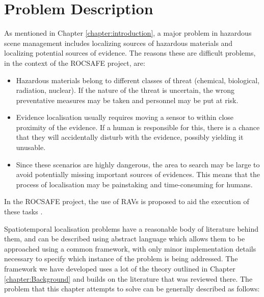\section{Problem Description}\label{sec:TLocalisationProbDescription}
As mentioned in Chapter \ref{chapter:introduction}, a major problem in hazardous scene management includes localizing sources of hazardous materials and localizing potential sources of evidence. The reasons these are difficult problems, in the context of the ROCSAFE project, are:
\begin{itemize}
    \item Hazardous materials belong to different classes of threat (chemical, biological, radiation, nuclear). If the nature of the threat is uncertain, the wrong preventative measures may be taken and personnel may be put at risk. 
    \item Evidence localisation usually requires moving a sensor to within close proximity of the evidence. If a human is responsible for this, there is a chance that they will accidentally disturb with the evidence, possibly yielding it unusable.
    \item Since these scenarios are highly dangerous, the area to search may be large to avoid potentially missing important sources of evidences. This means that the process of localisation may be painstaking and time-consuming for humans.
\end{itemize}
In the ROCSAFE project, the use of RAVs is proposed to aid the execution of these tasks \cite{Bagherzadeh2017ROCSAFE:Incidents}.%

  



Spatiotemporal localisation problems have a reasonable body of literature behind them, and can be described using abstract language which allows them to be approached using a common framework, with only minor implementation details necessary to specify which instance of the problem is being addressed. The framework we have developed uses a lot of the theory outlined in Chapter \ref{chapter:Background} and builds on the literature that was reviewed there. The problem that this chapter attempts to solve can be generally described as follows: \par

